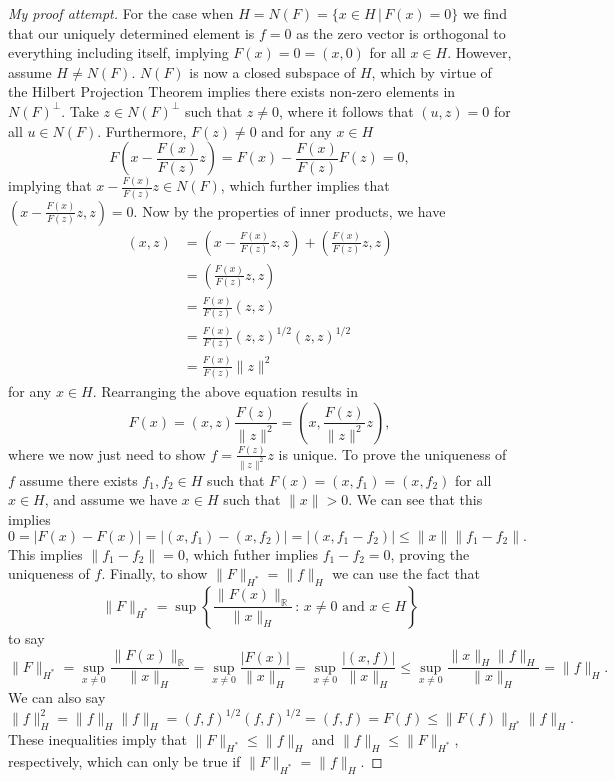 \documentclass[11pt]{article}
\theoremstyle{definition}
\begin{document}
\begin{proof}[My proof attempt]
	For the case when $H = N(F) = \{x \in H \, | \, F(x) = 0\}$ we find that our uniquely determined element is $f=0$ as the zero vector is
	orthogonal to everything including itself, implying $F(x) = 0 = (x,0)$ for all $x \in H$. However, assume $H \not= N(F)$.
	$N(F)$ is now a closed subspace of $H$, which by virtue of the Hilbert Projection Theorem implies there exists non-zero elements in $N(F)^{\bot}$.
	Take $z \in N(F)^{\bot}$ such that $z \not= 0$, where it follows that $(u,z) = 0$ for all $u \in N(F)$. Furthermore, $F(z) \not= 0$ and for any $x \in H$
	\[F\left(x - \frac{F(x)}{F(z)}z\right) = F(x) - \frac{F(x)}{F(z)}F(z) = 0,\]
	implying that $x - \frac{F(x)}{F(z)}z \in N(F)$, which further implies that $\left(x - \frac{F(x)}{F(z)}z, z\right) = 0$.
	Now by the properties of inner products, we have
	\begin{equation*}
		\begin{aligned}
			(x,z) &= \left(x - \frac{F(x)}{F(z)}z,z\right) + \left(\frac{F(x)}{F(z)}z,z\right) \\
			      &= \left(\frac{F(x)}{F(z)}z,z\right) \\
			      &= \frac{F(x)}{F(z)}(z,z) \\
			      &= \frac{F(x)}{F(z)}(z,z)^{1/2}(z,z)^{1/2} \\
			      &= \frac{F(x)}{F(z)}\|z\|^2
		\end{aligned}
	\end{equation*}
	for any $x \in H$. Rearranging the above equation results in 
	\[F(x) = (x,z)\frac{F(z)}{\|z\|^2} = \left(x,\frac{F(z)}{\|z\|^2}z\right),\]
	where we now just need to show $f = \frac{F(z)}{\|z\|^2}z$ is unique.
	To prove the uniqueness of $f$ assume there exists $f_1,f_2 \in H$ such that $F(x) = (x,f_1) = (x,f_2)$ for all $x \in H$,
	and assume we have $x \in H$ such that $\|x\| > 0$. We can see that this implies
	\begin{equation*}
		0 = |F(x) - F(x)| = |(x,f_1) - (x,f_2)| = |(x,f_1-f_2)| \leq \|x\|\|f_1 - f_2\|.
	\end{equation*}
	This implies $\|f_1-f_2\| = 0$, which futher implies $f_1-f_2= 0$, proving the uniqueness of $f$.
	Finally, to show $\|F\|_{H^*} = \|f\|_H$ we can use the fact that
	\begin{equation*}
		\|F\|_{H^*} = \sup\left\{\frac{\|F(x)\|_{\mathbb{R}}}{\|x\|_H}\, : \, x \not= 0 \text{ and } x \in H\right\}
	\end{equation*}
	to say
	\begin{equation*}
		\|F\|_{H^*} = \sup_{x\not=0}{\frac{\|F(x)\|_{\mathbb{R}}}{\|x\|_H}} = \sup_{x\not=0}{\frac{|F(x)|}{\|x\|_H}} = \sup_{x\not=0}{\frac{|(x,f)|}{\|x\|_H}} \leq \sup_{x\not=0}{\frac{\|x\|_H\|f\|_H}{\|x\|_H}} = \|f\|_H.
	\end{equation*}
	We can also say
	\begin{equation*}
		\|f\|_H^2 = \|f\|_H\|f\|_H = (f,f)^{1/2}(f,f)^{1/2} = (f,f) = F(f) \leq \|F(f)\|_{H^*}\|f\|_H.
	\end{equation*}
	These inequalities imply that $\|F\|_{H^*} \leq \|f\|_H$ and $\|f\|_H \leq \|F\|_{H^*}$, respectively, which can only be true if $\|F\|_{H^*} = \|f\|_H$.
\end{proof}
\end{document}

